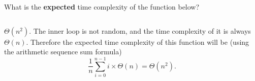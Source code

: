 \begin{prob}
    What is the \textbf{expected} time complexity of the function below?

    \inputminted{python}{./code.py}

    \begin{soln}
        $\Theta(n^2)$. The inner loop is not random, and the time complexity of it is always $\Theta(n)$. Therefore the expected time complexity 
        of this function will be (using the arithmetic sequence sum formula)
        \[ \frac{1}{n} \sum_{i = 0}^{n - 1} i \times \Theta(n) = \Theta(n^2). \]
    \end{soln}

\end{prob}
